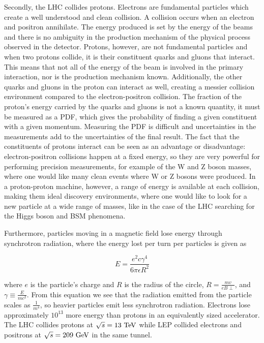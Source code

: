 Secondly, the \ac{LHC} collides protons. Electrons are fundamental particles which create a well understood and clean collision. A collision occurs when an electron and positron annihilate. The energy produced is set by the energy of the beams and there is no ambiguity in the production mechanism of the physical process observed in the detector. Protons, however, are not fundamental particles and when two protons collide, it is their constituent quarks and gluons that interact. This means that not all of the energy of the beam is involved in the primary interaction, nor is the production mechanism known. Additionally, the other quarks and gluons in the proton can interact as well, creating a messier collision environment compared to the electron-positron collision. The fraction of the proton's energy carried by the quarks and gluons is not a known quantity, it must be measured as a \ac{PDF}, which gives the probability of finding a given constituent with a given momentum. Measuring the \ac{PDF} is difficult and uncertainties in the measurements add to the uncertainties of the final result. The fact that the constituents of protons interact can be seen as an advantage or disadvantage: electron-positron collisions happen at a fixed energy, so they are very powerful for performing precision measurements, for example of the W and Z boson masses, where one would like many clean events where W or Z bosons were produced. In a proton-proton machine, however, a range of energy is available at each collision, making them ideal discovery environments, where one would like to look for a new particle at a wide range of masses, like in the case of the \ac{LHC} searching for the Higgs boson and \ac{BSM} phenomena.

Furthermore, particles moving in a magnetic field lose energy through synchrotron radiation, where the energy lost per turn per particles is given as

\begin{equation}
E = \frac{e^2c\gamma^4}{6\pi\epsilon R^2}
\end{equation}

where $e$ is the particle's charge and $R$ is the radius of the circle, $R=\frac{mv}{eB\perp}$, and $\gamma \equiv \frac{E}{mc^2}$. From this equation we see that the radiation emitted from the particle scales as $\frac{1}{m^4}$, so heavier particles emit less synchrotron radiation. Electrons lose approximately $10^{13}$ more energy than protons in an equivalently sized accelerator. The \ac{LHC} collides protons at $\sqrt{s} = 13 \TeV$ while \ac{LEP} collided electrons and positrons at $\sqrt{s} = 209 \GeV$ in the same tunnel.



